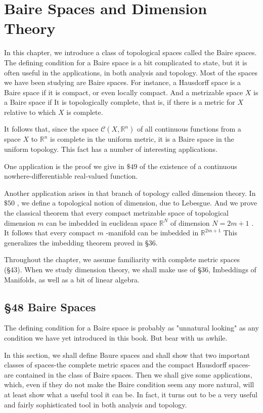 
\chapter{Baire Spaces and Dimension Theory}

In this chapter, we introduce a class of topological spaces called the Baire spaces. The defining condition for a Baire space is a bit complicated to state, but it is often useful in the applications, in both analysis and topology. Most of the spaces we have been studying are Baire spaces. For instance, a Hausdorff space is a Baire space if it is compact, or even locally compact. And a metrizable space \(X\) is a Baire space if It is topologically complete, that is, if there is a metric for \(X\) relative to which \(X\) is complete.

It follows that, since the space \(\mathcal{C}\left( {X,{\mathbb{R}}^{n}}\right)\) of all continuous functions from a space \(X\) to \({\mathbb{R}}^{n}\) is complete in the uniform metric, it is a Baire space in the uniform topology. This fact has a number of interesting applications.

One application is the proof we give in \(\$ {49}\) of the existence of a continuous nowhere-differentiable real-valued function.

Another application arises in that branch of topology called dimension theory. In \(\$ {50}\) , we define a topological notion of dimension, due to Lebesgue. And we prove the classical theorem that every compact metrizable space of topological dimension \(m\) can be imbedded in euclidean space \({\mathbb{R}}^{N}\) of dimension \(N = {2m} + 1\) . It follows that every compact \(m\) -manifold can be imbedded in \({\mathbb{R}}^{{2m} + 1}\) This generalizes the imbedding theorem proved in §36.

Throughout the chapter, we assume familiarity with complete metric spaces (§43). When we study dimension theory, we shall make use of §36, Imbeddings of Manifolds, as well as a bit of linear algebra.

\section*{§48 Baire Spaces}

The defining condition for a Baire space is probably as "unnatural looking" as any condition we have yet introduced in this book. But bear with us awhile.

In this section, we shall define Baure spaces and shall show that two important classes of spaces-the complete metric spaces and the compact Hausdorff spaces-are contained in the class of Baire spaces. Then we shall give some applications, which, even if they do not make the Baire condition seem any more natural, will at least show what a useful tool it can be. In fact, it turns out to be a very useful and fairly sophisticated tool in both analysis and topology.

